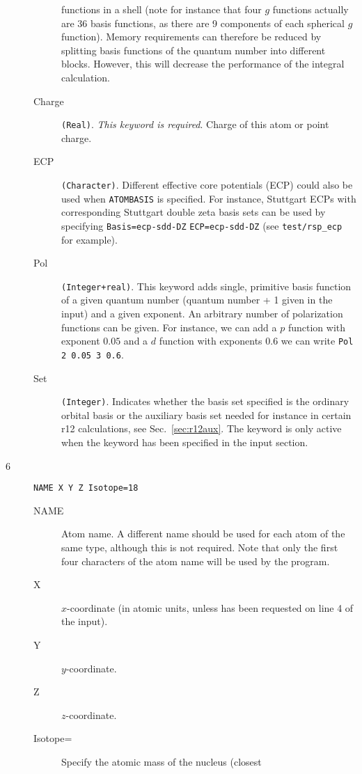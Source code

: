 \begin{description}
\begin{description}
functions in a shell (note for instance that four $g$ functions
actually are 36 basis functions,
as there are 9 components of each spherical $g$ function).
Memory requirements can therefore be reduced by splitting
basis functions of the quantum number into different blocks. However,
this will decrease the performance of the
integral calculation.
\item[Charge] \verb|(Real)|. {\em This keyword is required\/}.
  Charge of this atom or point charge. 
\item[ECP] \verb|(Character)|.
  Different effective core potentials (ECP) could also be used when \verb|ATOMBASIS|
  is specified. For instance, Stuttgart ECPs with corresponding
  Stuttgart double zeta basis sets can be used by specifying
  \verb|Basis=ecp-sdd-DZ| \verb|ECP=ecp-sdd-DZ| (see \verb|test/rsp_ecp| for example).
\item[Pol] \verb|(Integer+real)|. This keyword adds single, primitive
  basis function of a given quantum number (quantum number + 1 given
  in the input) and a given exponent. An arbitrary number of
  polarization functions can be given. For instance, we can add a $p$
  function with exponent $0.05$ and a $d$ function with exponents
  $0.6$ we can write \verb|Pol 2 0.05 3 0.6|.
\item[Set] \verb|(Integer)|. Indicates whether the basis set specified
  is the ordinary orbital basis or the auxiliary basis set needed for
  instance in certain r12 calculations, see
  Sec.~\ref{sec:r12aux}. The keyword is only active when the keyword
   has been specified in the  input section.
\end{description}
\item[6] \verb|NAME X Y Z Isotope=18|
\begin{description}
\item[NAME] Atom name.  A different name should be used for
each atom of the same type, although this is not required. Note that
only the first four characters of the atom name will be used by the
program.
\item[X] $x$-coordinate (in atomic units, unless \angstrom{}
has been requested on line 4 of the input).
\item[Y] $y$-coordinate.
\item[Z] $z$-coordinate.
\item[Isotope=]  Specify the atomic mass of the nucleus (closest

\end{description}
\end{description}
